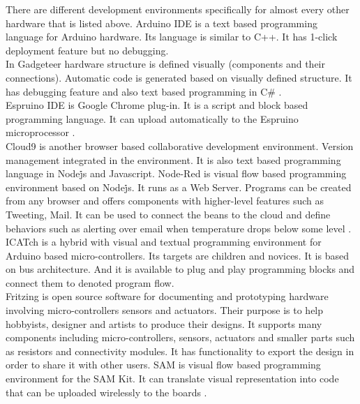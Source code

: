 There are different development environments specifically for almost every other hardware that is listed above.  Arduino IDE is a text based programming language for Arduino hardware. Its language is similar to C++. It has 1-click deployment feature but no debugging.  \\

In Gadgeteer hardware structure is defined visually (components and their connections). Automatic code is generated based on visually defined structure. It has debugging feature and also text based programming in C\# \cite{25}.  \\

Espruino IDE is Google Chrome plug-in. It is a script and block based programming language. It can upload automatically to the Espruino microprocessor \cite{26}. \\

Cloud9 is another browser based collaborative development environment. Version management integrated in the environment. It is also text based programming language in Node\.js and Javascript. Node-Red is visual flow based programming environment based on Node\.js. It runs as a Web Server. Programs can be created from any browser and offers components with higher-level features such as Tweeting, Mail. It can be used to connect the beans to the cloud and define behaviors such as alerting over email when temperature drops below some level \cite{27}. \\

I\*CATch is a hybrid with visual and textual programming environment for Arduino based micro-controllers. Its targets are children and novices. It is based on bus architecture. And it is available to plug and play programming blocks and connect them to denoted program flow.  \\

Fritzing is open source software for documenting and prototyping hardware involving micro-controllers sensors and actuators. Their purpose is to help hobbyists, designer and artists to produce their designs. It supports many components including micro-controllers, sensors, actuators and smaller parts such as resistors and connectivity modules. It has functionality to export the design in order to share it with other users. SAM is visual flow based programming environment for the SAM Kit. It can translate visual representation into code that can be uploaded wirelessly to the boards \cite{29}. \\



